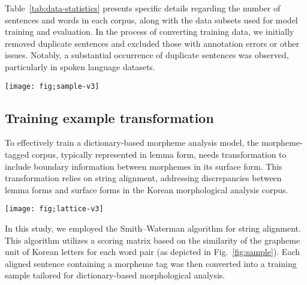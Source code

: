 \documentclass[AMS,STIX2COL]{WileyNJD-v2}
\begin{document}
    Table~\ref{tab:data-statistics} presents specific details regarding the number of sentences and words in each corpus, along with the data subsets used for model training and evaluation.
    In the process of converting training data, we initially removed duplicate sentences and excluded those with annotation errors or other issues.
    Notably, a substantial occurrence of duplicate sentences was observed, particularly in spoken language datasets.

    \begin{figure*}[ht]
        \centerline{\texttt{[image: fig;sample-v3]}}
        \caption{Transformation of a single sentence in the Korean morpheme-tagged corpus into a single training sample.}
        \label{fig:sample}
    \end{figure*}

    \subsection{Training example transformation}\label{subsec:training-example-transformation}

    To effectively train a dictionary-based morpheme analysis model, the morpheme-tagged corpus, typically represented in lemma form, needs transformation to include boundary information between morphemes in its surface form.
    This transformation relies on string alignment, addressing discrepancies between lemma forms and surface forms in the Korean morphological analysis corpus.

    \begin{figure*}[ht]
        \centerline{\texttt{[image: fig;lattice-v3]}}
        \caption{An illustrated example of a constructed lattice, the best-decoded result, and a set of the generated secondary paths. A lattice is constructed by restricting a set of nodes by morpheme lexicon, where each node is marked by its ``rank'' among a set of morphemes whose starting positions are all the same. The best path indicates the sequence of top-1 nodes in the lattice, that is, nodes marked by the 1st rank. A secondary path is generated by replacing a top-1 node with the next top node at the same starting position, which is marked by the 2nd rank.}
        \label{fig:lattice}
    \end{figure*}

    In this study, we employed the Smith--Waterman algorithm for string alignment.
    This algorithm utilizes a scoring matrix based on the similarity of the grapheme unit of Korean letters for each word pair (as depicted in Fig.~\ref{fig:sample}).
    Each aligned sentence containing a morpheme tag was then converted into a training sample tailored for dictionary-based morphological analysis.
\end{document}
